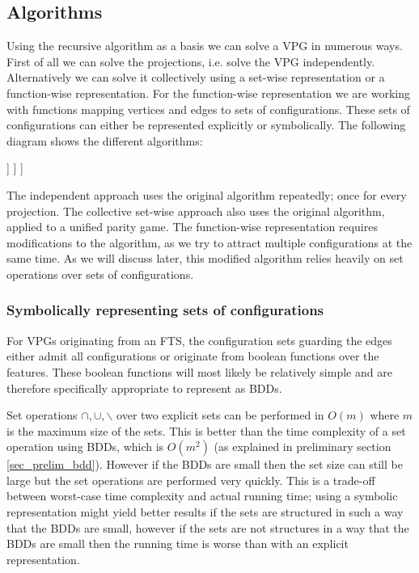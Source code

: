 \subsection{Algorithms}
Using the recursive algorithm as a basis we can solve a VPG in numerous ways. First of all we can solve the projections, i.e. solve the VPG independently. Alternatively we can solve it collectively using a set-wise representation or a function-wise representation. For the function-wise representation we are working with functions mapping vertices and edges to sets of configurations. These sets of configurations can either be represented explicitly or symbolically. The following diagram shows the different algorithms:
\begin{center}
	\begin{forest}
		[Recursive algorithm, for tree={parent anchor=south, child anchor=north, align=center, s sep=5mm}
		[Independent]
		[Collective
		[Set-wise]
		[Function-wise
		[Explicit]
		[Symbolic]
		]
		]
		]
	\end{forest}
\end{center}
The independent approach uses the original algorithm repeatedly; once for every projection. The collective set-wise approach also uses the original algorithm, applied to a unified parity game. The function-wise representation requires modifications to the algorithm, as we try to attract multiple configurations at the same time. As we will discuss later, this modified algorithm relies heavily on set operations over sets of configurations. 

\subsubsection{Symbolically representing sets of configurations}
\label{sec:symrepconfs}
For VPGs originating from an FTS, the configuration sets guarding the edges either admit all configurations or originate from boolean functions over the features. These boolean functions will most likely be relatively simple and are therefore specifically appropriate to represent as BDDs.

Set operations $\cap,\cup,\backslash$ over two explicit sets can be performed in $O(m)$ where $m$ is the maximum size of the sets. This is better than the time complexity of a set operation using BDDs, which is $O(m^2)$ (as explained in preliminary section \ref{sec_prelim_bdd}). However if the BDDs are small then the set size can still be large but the set operations are performed very quickly. This is a trade-off between worst-case time complexity and actual running time; using a symbolic representation might yield better results if the sets are structured in such a way that the BDDs are small, however if the sets are not structures in a way that the BDDs are small then the running time is worse than with an explicit representation.

